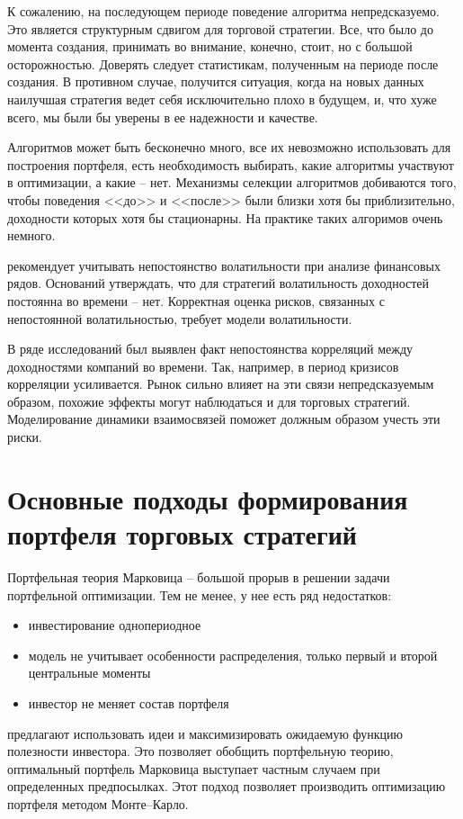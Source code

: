 К сожалению, на последующем периоде поведение алгоритма непредсказуемо. Это является структурным сдвигом для торговой стратегии. Все, что было до момента создания, принимать во внимание, конечно, стоит, но с большой осторожностью. Доверять следует статистикам, полученным на периоде после создания. В противном случае, получится ситуация, когда на новых данных наилучшая стратегия ведет себя исключительно плохо в будущем, и, что хуже всего, мы были бы уверены в ее надежности и качестве. 

Алгоритмов может быть бесконечно много, все их невозможно использовать для построения портфеля, есть необходимость выбирать, какие алгоритмы участвуют в оптимизации, а какие -- нет. Механизмы селекции алгоритмов добиваются того, чтобы поведения <<до>> и <<после>> были близки хотя бы приблизительно, доходности которых хотя бы стационарны. На практике таких алгоримов очень немного.
 
\citep{dumas1998} рекомендует учитывать непостоянство волатильности при анализе финансовых рядов. Оснований утверждать, что для стратегий волатильность доходностей постоянна во времени -- нет. Корректная оценка рисков, связанных с непостоянной волатильностью, требует модели волатильности.

В ряде исследований \citep{vaga1990, oral2017} был выявлен факт непостоянства корреляций между доходностями компаний во времени. Так, например, в период кризисов корреляции усиливается. Рынок сильно влияет на эти связи непредсказуемым образом, похожие эффекты могут наблюдаться и для торговых стратегий. Моделирование динамики взаимосвязей поможет должным образом учесть эти риски.

\section{Основные подходы формирования портфеля торговых стратегий}
Портфельная теория Марковица \citep{markovitz1959} -- большой прорыв в решении задачи портфельной оптимизации. Тем не менее, у нее есть ряд недостатков\citep{lorenz2008thesis}:
\begin{itemize}
	\item инвестирование однопериодное
	\item модель не учитывает особенности распределения, только первый и второй центральные моменты
	\item инвестор не меняет состав портфеля
\end{itemize}
\cite{lorenz2008thesis, bucciol2006} предлагают использовать идеи \cite{neumann1944} и максимизировать ожидаемую функцию полезности инвестора. Это позволяет обобщить портфельную теорию, оптимальный портфель Марковица выступает частным случаем при определенных предпосылках. Этот подход позволяет производить оптимизацию портфеля методом Монте--Карло.

